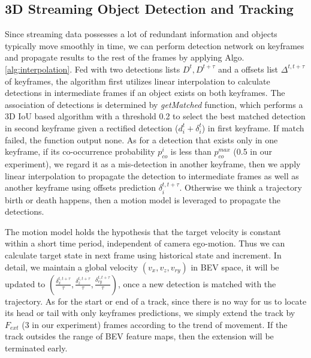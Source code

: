 \documentclass[a4paper, 10pt, conference]{ieeeconf}      %
\begin{document}

\subsection{3D Streaming Object Detection and Tracking}
Since streaming data possesses a lot of redundant information and objects typically move smoothly in time, we can perform detection network on keyframes and propagate results to the rest of the frames by applying  Algo. \ref{alg:interpolation}. Fed with two detections lists $D^t, D^{t+\tau}$ and a offsets list $\Delta^{t, t+\tau}$ of keyframes, the algorithm first utilizes linear interpolation to calculate detections in intermediate frames if an object exists on both keyframes. The association of detections is determined by \textit{getMatched} function, which performs a 3D IoU based algorithm with a threshold 0.2 to select the best matched detection in second keyframe given a rectified detection ($d_i^t + \delta_i^t$) in first keyframe. If match failed, the function output none. As for a detection that exists only in one keyframe, if its co-occurrence probability $p_{co}^i$ is less than $p_{co}^{max}$ (0.5 in our experiment), we regard it as a mis-detection in another keyframe, then we apply linear interpolation to propagate the detection to intermediate frames as well as another keyframe using offsets prediction $\delta^{t, t+ \tau}_i$. Otherwise we think a trajectory birth or death happens, then a motion model is leveraged to propagate the detections.

The motion model holds the hypothesis that the target velocity is constant within a short time period, independent of camera ego-motion. Thus we can calculate target state in next frame using historical state and increment. In detail, we maintain a global velocity $(v_x, v_z, v_{ry})$ in BEV space, it will be updated to $(\frac{\delta_{x}^{t, t+\tau}}{\tau}, \frac{\delta_{z}^{t, t+\tau}}{\tau}, \frac{\delta_{ry}^{t, t+\tau}}{\tau})$, once a new detection is matched with the trajectory. As for the start or end of a track, since there is no way for us to locate its head or tail with only keyframes predictions, we simply extend the track by $F_{ext}$ (3 in our experiment) frames according to the trend of movement. If the track outsides the range of BEV feature maps, then the extension will be terminated early. 
\end{document}
